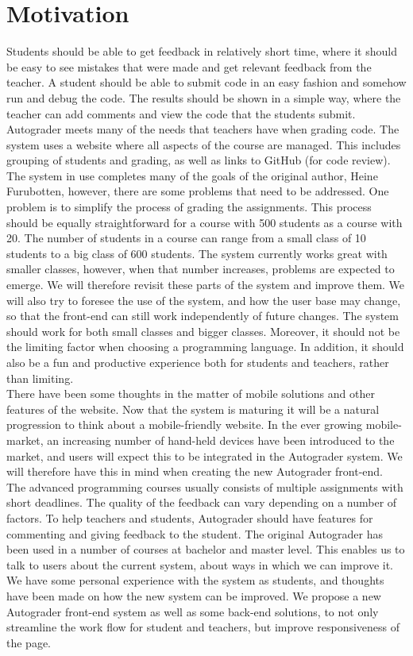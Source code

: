 \chapter*{Motivation}
Students should be able to get feedback in relatively short time, where it should be easy to see mistakes that were made and get relevant feedback from the teacher. A student should be able to submit code in an easy fashion and somehow run and debug the code. The results should be shown in a simple way, where the teacher can add comments and view the code that the students submit. Autograder meets many of the needs that teachers have when grading code. The system uses a website where all aspects of the course are managed. This includes grouping of students and grading, as well as links to GitHub (for code review). \\The system in use completes many of the goals of the original author, Heine Furubotten, however, there are some problems that need to be addressed. One problem is to simplify the process of grading the assignments. This process should be equally straightforward for a course with 500 students as a course with 20. The number of students in a course can range from a small class of 10 students to a big class of 600 students. The system currently works great with smaller classes, however, when that number increases, problems are expected to emerge. We will therefore revisit these parts of the system and improve them. We will also try to foresee the use of the system, and how the user base may change, so that the front-end can still work independently of future changes. The system should work for both small classes and bigger classes. Moreover, it should not be the limiting factor when choosing a programming language. In addition, it should also be a fun and productive experience both for students and teachers, rather than limiting.\\There have been some thoughts in the matter of mobile solutions and other features of the website. Now that the system is maturing it will be a natural progression to think about a mobile-friendly website. In the ever growing mobile-market, an increasing number of hand-held devices have been introduced to the market, and users will expect this to be integrated in the Autograder system. We will therefore have this in mind when creating the new Autograder front-end.\\The advanced programming courses usually consists of multiple assignments with short deadlines. The quality of the feedback can vary depending on a number of factors. To help teachers and students, Autograder should have features for commenting and giving feedback to the student. The original Autograder has been used in a number of courses at bachelor and master level. This enables us to talk to users about the current system, about ways in which we can improve it. We have some personal experience with the system as students, and thoughts have been made on how the new system can be improved. We propose a new Autograder front-end system as well as some back-end solutions, to not only streamline the work flow for student and teachers, but improve responsiveness of the page.
